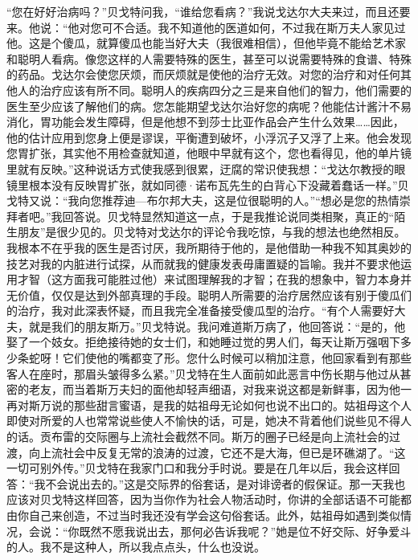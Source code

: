 \par “您在好好治病吗？”贝戈特问我，“谁给您看病？”我说戈达尔大夫来过，而且还要来。他说：“他对您可不合适。我不知道他的医道如何，不过我在斯万夫人家见过他。这是个傻瓜，就算傻瓜也能当好大夫（我很难相信），但他毕竟不能给艺术家和聪明人看病。像您这样的人需要特殊的医生，甚至可以说需要特殊的食谱、特殊的药品。戈达尔会使您厌烦，而厌烦就是使他的治疗无效。对您的治疗和对任何其他人的治疗应该有所不同。聪明人的疾病四分之三是来自他们的智力，他们需要的医生至少应该了解他们的病。您怎能期望戈达尔治好您的病呢？他能估计酱汁不易消化，胃功能会发生障碍，但是他想不到莎士比亚作品会产生什么效果……因此，他的估计应用到您身上便是谬误，平衡遭到破坏，小浮沉子又浮了上来。他会发现您胃扩张，其实他不用检查就知道，他眼中早就有这个，您也看得见，他的单片镜里就有反映。”这种说话方式使我感到很累，迂腐的常识使我想：“戈达尔教授的眼镜里根本没有反映胃扩张，就如同德·诺布瓦先生的白背心下没藏着蠢话一样。”贝戈特又说：“我向您推荐迪—布尔邦大夫，这是位很聪明的人。”“想必是您的热情崇拜者吧。”我回答说。贝戈特显然知道这一点，于是我推论说同类相聚，真正的“陌生朋友”是很少见的。贝戈特对戈达尔的评论令我吃惊，与我的想法也绝然相反。我根本不在乎我的医生是否讨厌，我所期待于他的，是他借助一种我不知其奥妙的技艺对我的内脏进行试探，从而就我的健康发表毋庸置疑的旨喻。我并不要求他运用才智（这方面我可能胜过他）来试图理解我的才智；在我的想象中，智力本身并无价值，仅仅是达到外部真理的手段。聪明人所需要的治疗居然应该有别于傻瓜们的治疗，我对此深表怀疑，而且我完全准备接受傻瓜型的治疗。“有个人需要好大夫，就是我们的朋友斯万。”贝戈特说。我问难道斯万病了，他回答说：“是的，他娶了一个妓女。拒绝接待她的女士们，和她睡过觉的男人们，每天让斯万强咽下多少条蛇呀！它们使他的嘴都变了形。您什么时候可以稍加注意，他回家看到有那些客人在座时，那眉头皱得多么紧。”贝戈特在生人面前如此恶言中伤长期与他过从甚密的老友，而当着斯万夫妇的面他却轻声细语，对我来说这都是新鲜事，因为他一再对斯万说的那些甜言蜜语，是我的姑祖母无论如何也说不出口的。姑祖母这个人即使对所爱的人也常常说些使人不愉快的话，可是，她决不背着他们说些见不得人的话。贡布雷的交际圈与上流社会截然不同。斯万的圈子已经是向上流社会的过渡，向上流社会中反复无常的浪涛的过渡，它还不是大海，但已是环礁湖了。“这一切可别外传。”贝戈特在我家门口和我分手时说。要是在几年以后，我会这样回答：“我不会说出去的。”这是交际界的俗套话，是对诽谤者的假保证。那一天我也应该对贝戈特这样回答，因为当你作为社会人物活动时，你讲的全部话语不可能都由你自己来创造，不过当时我还没有学会这句俗套话。此外，姑祖母如遇到类似情况，会说：“你既然不愿我说出去，那何必告诉我呢？”她是位不好交际、好争爱斗的人。我不是这种人，所以我点点头，什么也没说。

